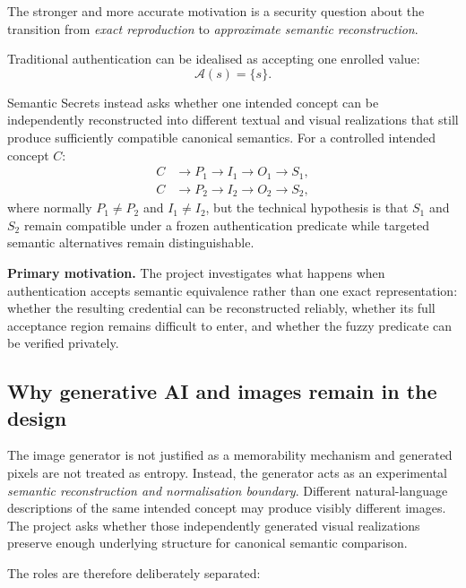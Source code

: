 \documentclass[11pt,a4paper]{article}
\newcommand{\Aset}{\mathcal{A}}
\begin{document}
The stronger and more accurate motivation is a security question about the transition from \emph{exact reproduction} to \emph{approximate semantic reconstruction}.

Traditional authentication can be idealised as accepting one enrolled value:
\begin{equation}
  \Aset(s)=\{s\}.
\end{equation}

Semantic Secrets instead asks whether one intended concept can be independently reconstructed into different textual and visual realizations that still produce sufficiently compatible canonical semantics. For a controlled intended concept $C$:
\begin{align}
  C &\rightarrow P_1 \rightarrow I_1 \rightarrow O_1 \rightarrow S_1,\\
  C &\rightarrow P_2 \rightarrow I_2 \rightarrow O_2 \rightarrow S_2,
\end{align}
where normally $P_1\neq P_2$ and $I_1\neq I_2$, but the technical hypothesis is that $S_1$ and $S_2$ remain compatible under a frozen authentication predicate while targeted semantic alternatives remain distinguishable.

\begin{keybox}
\textbf{Primary motivation.} The project investigates what happens when authentication accepts semantic equivalence rather than one exact representation: whether the resulting credential can be reconstructed reliably, whether its full acceptance region remains difficult to enter, and whether the fuzzy predicate can be verified privately.
\end{keybox}

\subsection{Why generative AI and images remain in the design}

The image generator is not justified as a memorability mechanism and generated pixels are not treated as entropy. Instead, the generator acts as an experimental \emph{semantic reconstruction and normalisation boundary}. Different natural-language descriptions of the same intended concept may produce visibly different images. The project asks whether those independently generated visual realizations preserve enough underlying structure for canonical semantic comparison.

The roles are therefore deliberately separated:
\end{document}
